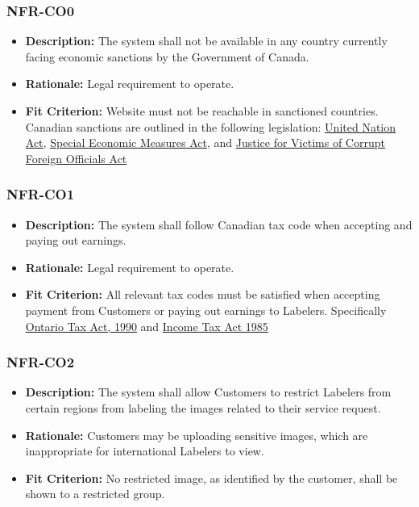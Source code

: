 \documentclass[12pt]{article}
\begin{document}
\subsubsection*{NFR-CO0}
\begin{itemize}
  \item \textbf{Description:} The system shall not be available in any country currently facing economic sanctions by the Government of Canada.
  \item \textbf{Rationale:} Legal requirement to operate.
  \item \textbf{Fit Criterion:} Website must not be reachable in sanctioned countries. Canadian sanctions are outlined in the following legislation: \href{http://laws-lois.justice.gc.ca/eng/acts/U-2/index.html}{United Nation Act}, \href{http://laws-lois.justice.gc.ca/eng/acts/S-14.5/index.html}{Special Economic Measures Act}, and \href{http://laws.justice.gc.ca/eng/acts/J-2.3/}{Justice for Victims of Corrupt Foreign Officials Act}
\end{itemize}
\subsubsection*{NFR-CO1}
\begin{itemize}
  \item \textbf{Description:} The system shall follow Canadian tax code when accepting and paying out earnings.
  \item \textbf{Rationale:} Legal requirement to operate.
  \item \textbf{Fit Criterion:} All relevant tax codes must be satisfied when accepting payment from Customers or paying out earnings to Labelers. Specifically \href{https://www.ontario.ca/laws/statute/90c40}{Ontario Tax Act, 1990} and \href{https://laws-lois.justice.gc.ca/eng/acts/i-3.3/}{Income Tax Act 1985}
\end{itemize}
\subsubsection*{NFR-CO2}
\begin{itemize}
  \item \textbf{Description:} The system shall allow Customers to restrict Labelers from certain regions from labeling the images related to their service request.
  \item \textbf{Rationale:} Customers may be uploading sensitive images, which are inappropriate for international Labelers to view.
  \item \textbf{Fit Criterion:} No restricted image, as identified by the customer, shall be shown to a restricted group.
\end{itemize}
\end{document}
